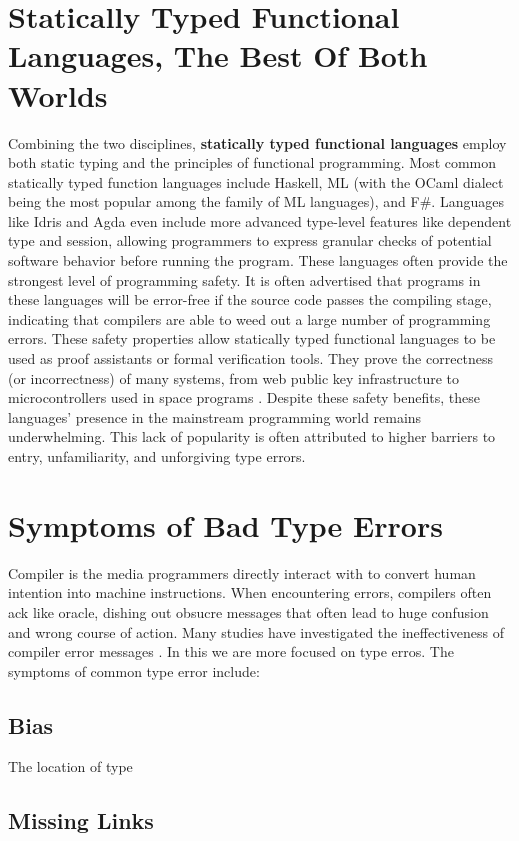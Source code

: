 \section{Statically Typed Functional Languages, The Best Of Both Worlds}
Combining the two disciplines, \textbf{statically typed functional languages} employ both static typing and the principles of functional programming. Most common statically typed function languages include Haskell,  ML (with the OCaml dialect being the most popular among the family of ML languages), and F\#. Languages like Idris and Agda even include more advanced type-level features like dependent type and session, allowing programmers to express granular checks of potential software behavior before running the program. These languages often provide the strongest level of programming safety. It is often advertised that programs in these languages will be error-free if the source code passes the compiling stage, indicating that compilers are able to weed out a large number of programming errors. These safety properties allow statically typed functional languages to be used as proof assistants or formal verification tools. They prove the correctness (or incorrectness) of many systems, from web public key infrastructure \cite{Bhargavan2021-no} to microcontrollers used in space programs \cite{Mokhov2019-zj}. Despite these safety benefits, these languages' presence in the mainstream programming world remains underwhelming. This lack of popularity is often attributed to higher barriers to entry, unfamiliarity, and unforgiving type errors.

\section{Symptoms of Bad Type Errors}
 Compiler is the media programmers directly interact with to convert human intention into machine instructions. When encountering errors, compilers often ack like oracle, dishing out obsucre messages that often lead to huge confusion and wrong course of action. Many studies have investigated the ineffectiveness of compiler error messages \cite{}. In this we are more focused on type erros. The symptoms of common type error include:



 \subsection{Bias}
 The location of type 

 \subsection{Missing Links}

